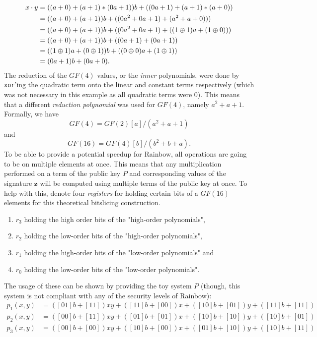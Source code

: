 \begin{equation*}
    \begin{split}
        x\cdot y &= ((a + 0) + (a + 1)*(0a + 1))b + ((0a + 1) + (a + 1)*(a + 0))\\
        &= ((a + 0) + (a + 1))b + ((0a^2 + 0a + 1) + (a^2 + a + 0)))\\
        &= ((a + 0) + (a + 1))b + ((0a^2 + 0a + 1) + ((1 \oplus 1)a + (1 \oplus 0)))\\
        &= ((a + 0) + (a + 1))b + ((0a + 1) + (0a + 1))\\
        &= ((1 \oplus 1)a + (0 \oplus 1))b + ((0 \oplus 0)a + (1 \oplus 1))\\
        &= (0a + 1)b + (0a + 0).
    \end{split}
\end{equation*}
The reduction of the $GF(4)$ values, or the \textit{inner} polynomials, were done by \texttt{xor}'ing the quadratic term onto the linear and constant terms respectively (which was not necessary in this example as all quadratic terms were 0). This means that a different \emph{reduction polynomial} was used for $GF(4)$, namely $a^2 + a + 1$. Formally, we have
$$
    GF(4) = GF(2)[a]/(a^2 + a + 1)
$$
and
$$
    GF(16) = GF(4)[b]/(b^2 + b + a).
$$
To be able to provide a potential speedup for Rainbow, all operations are going to be on multiple elements at once. This means that any multiplication performed on a term of the public key $P$ and corresponding values of the signature $\textbf{z}$ will be computed using multiple terms of the public key at once. To help with this, denote four \emph{registers} for holding certain bits of a $GF(16)$ elements for this theoretical bitslicing construction.
\begin{enumerate}
    \item $r_3$ holding the high order bits of the "high-order polynomials",
    \item $r_2$ holding the low-order bits of the "high-order polynomials",
    \item $r_1$ holding the high-order bits of the "low-order polynomials" and
    \item $r_0$ holding the low-order bits of the "low-order polynomials".
\end{enumerate}
The usage of these can be shown by providing the toy system $P$ (though, this system is not compliant with any of the security levels of Rainbow):
\begin{equation*}
    \begin{split}
        p_1(x,y) &= ([01]b + [11]) xy + ([11]b + [00]) x + ([10]b + [01]) y + ([11]b + [11])\\
        p_2(x,y) &= ([00]b + [11]) xy + ([01]b + [01]) x + ([10]b + [10]) y + ([10]b + [01])\\
        p_3(x,y) &= ([00]b + [00]) xy + ([10]b + [00]) x + ([01]b + [10]) y + ([10]b + [11])
    \end{split}
\end{equation*}
